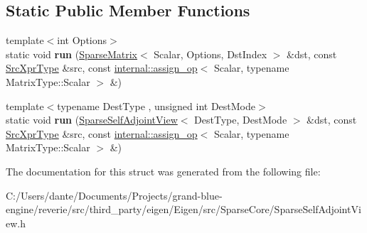 \subsection*{Static Public Member Functions}
\begin{DoxyCompactItemize}
\item 
\mbox{\label{struct_eigen_1_1internal_1_1_assignment_3_01_dst_xpr_type_00_01_sparse_symmetric_permutation_pro69955201e4d84b32d17d1959c46119e9_a860d6a0c898f8187dab5ca35567082cd}} 
{\footnotesize template$<$int Options$>$ }\\static void {\bfseries run} (\mbox{\hyperlink{class_eigen_1_1_sparse_matrix}{Sparse\+Matrix}}$<$ Scalar, Options, Dst\+Index $>$ \&dst, const \mbox{\hyperlink{class_eigen_1_1_sparse_symmetric_permutation_product}{Src\+Xpr\+Type}} \&src, const \mbox{\hyperlink{struct_eigen_1_1internal_1_1assign__op}{internal\+::assign\+\_\+op}}$<$ Scalar, typename Matrix\+Type\+::\+Scalar $>$ \&)
\item 
\mbox{\label{struct_eigen_1_1internal_1_1_assignment_3_01_dst_xpr_type_00_01_sparse_symmetric_permutation_pro69955201e4d84b32d17d1959c46119e9_a743214fc5df8550054cff8aaefc5d0db}} 
{\footnotesize template$<$typename Dest\+Type , unsigned int Dest\+Mode$>$ }\\static void {\bfseries run} (\mbox{\hyperlink{class_eigen_1_1_sparse_self_adjoint_view}{Sparse\+Self\+Adjoint\+View}}$<$ Dest\+Type, Dest\+Mode $>$ \&dst, const \mbox{\hyperlink{class_eigen_1_1_sparse_symmetric_permutation_product}{Src\+Xpr\+Type}} \&src, const \mbox{\hyperlink{struct_eigen_1_1internal_1_1assign__op}{internal\+::assign\+\_\+op}}$<$ Scalar, typename Matrix\+Type\+::\+Scalar $>$ \&)
\end{DoxyCompactItemize}


The documentation for this struct was generated from the following file\+:\begin{DoxyCompactItemize}
\item 
C\+:/\+Users/dante/\+Documents/\+Projects/grand-\/blue-\/engine/reverie/src/third\+\_\+party/eigen/\+Eigen/src/\+Sparse\+Core/Sparse\+Self\+Adjoint\+View.\+h\end{DoxyCompactItemize}
